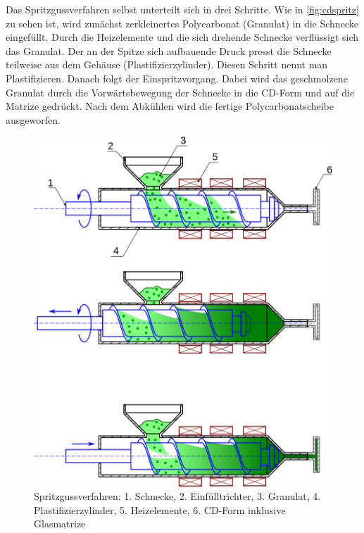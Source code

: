Das Spritzgussverfahren selbst unterteilt sich in drei Schritte. Wie in
\autoref{fig:cdspritz} zu sehen ist, wird zunächst zerkleinertes Polycarbonat
(Granulat) in die Schnecke eingefüllt. Durch die Heizelemente und die sich
drehende Schnecke verflüssigt sich das Granulat. Der an der Spitze sich
aufbauende Druck presst die Schnecke teilweise aus dem Gehäuse
(Plastifizierzylinder). Diesen Schritt nennt man Plastifizieren. Danach folgt
der Einspritzvorgang. Dabei wird das geschmolzene Granulat durch die
Vorwärtsbewegung der Schnecke in die CD-Form und auf die Matrize gedrückt. Nach
dem Abkühlen wird die fertige Polycarbonatscheibe ausgeworfen. \cite{cdpf}

\begin{figure}[h]
    \begin{center}
        \begin{minipage}[t]{\textwidth}
            \begin{center}
                \includegraphics[height=0.5\textheight]{Bilder/Optische_Datentraeger_Die_Compact_Disc/Herstellung/cdspritz.png}
                \caption[Spritzgussverfahren \newline \url{https://upload.wikimedia.org/wikipedia/commons/thumb/2/23/Principe_moulage_injection_polymere.svg/899px-Principe_moulage_injection_polymere.svg.png} (zuletzt aufgerufen am 11.08.2015)]{Spritzgussverfahren: 1. Schnecke, 2. Einfülltrichter, 3. Granulat, 4. Plastifizierzylinder, 5. Heizelemente, 6. CD-Form inklusive Glasmatrize}
                \label{fig:cdspritz}
            \end{center}
        \end{minipage}
    \end{center}
\end{figure}
